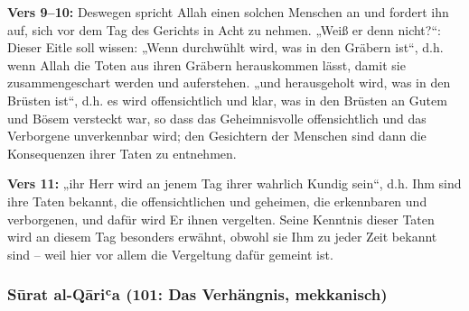 \textbf{Vers 9–10:} Deswegen spricht Allah einen solchen Menschen an und fordert ihn auf, sich
vor dem Tag des Gerichts in Acht zu nehmen. „Weiß er denn nicht?“: Dieser Eitle soll wissen:
„Wenn durchwühlt wird, was in den Gräbern ist“, d.h. wenn Allah die Toten aus ihren Gräbern
herauskommen lässt, damit sie zusammengeschart werden und auferstehen. „und herausgeholt
wird, was in den Brüsten ist“, d.h. es wird offensichtlich und klar, was in den Brüsten an Gutem
und Bösem versteckt war, so dass das Geheimnisvolle offensichtlich und das Verborgene
unverkennbar wird; den Gesichtern der Menschen sind dann die Konsequenzen ihrer Taten zu
entnehmen.

\textbf{Vers 11:} „ihr Herr wird an jenem Tag ihrer wahrlich Kundig sein“, d.h. Ihm sind ihre Taten
bekannt, die offensichtlichen und geheimen, die erkennbaren und verborgenen, und dafür wird
Er ihnen vergelten. Seine Kenntnis dieser Taten wird an diesem Tag besonders erwähnt, obwohl
sie Ihm zu jeder Zeit bekannt sind – weil hier vor allem die Vergeltung dafür gemeint ist.

\subsubsection*{Sūrat al-Qāriʿa (101: Das Verhängnis, mekkanisch)}

